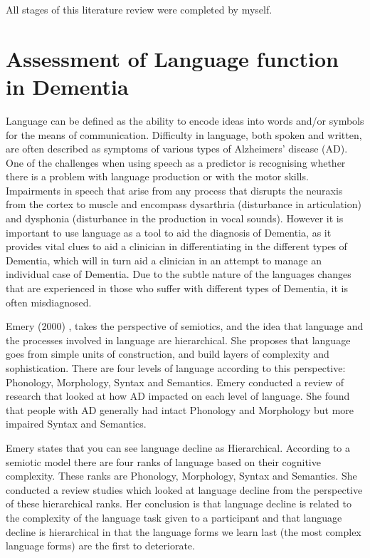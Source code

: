 \documentclass[a4paper]{article}
\begin{document}
All stages of this literature review were completed by myself. 

\section{Assessment of Language function in Dementia}

Language can be defined as the ability to encode ideas into words and/or symbols for the means of communication. Difficulty in language, both spoken and written, are often described as symptoms of various types of Alzheimers' disease (AD). One of the challenges when using speech as a predictor is recognising whether there is a problem with language production or with the motor skills. Impairments in speech that arise from any process that disrupts the neuraxis from the cortex to muscle and encompass dysarthria (disturbance in articulation) and dysphonia (disturbance in the production in vocal sounds). However it is important to use language as a tool to aid the diagnosis of Dementia, as it provides vital clues to aid a clinician in differentiating in the different types of Dementia, which will in turn aid a clinician in an attempt to manage an individual case of Dementia. Due to the subtle nature of the languages changes that are experienced in those who suffer with different types of Dementia, it is often misdiagnosed.

Emery (2000)  \cite{Emery2000}, takes the perspective of semiotics, and the idea that language and the processes involved in language are hierarchical. She proposes that language goes from simple units of construction, and build layers of complexity and sophistication. There are four levels of language according to this perspective: Phonology, Morphology, Syntax and Semantics. Emery conducted a review of research that looked at how AD impacted on each level of language. She found that people with AD generally had intact Phonology and Morphology but more impaired Syntax and Semantics. 	 

Emery states that you can see language decline as Hierarchical. According to a semiotic model there are four ranks of language based on their cognitive complexity. These ranks are Phonology, Morphology, Syntax and Semantics. She conducted a review studies which looked at language decline from the perspective of these hierarchical ranks. Her conclusion is that language decline is related to the complexity of the language task given to a participant and that language decline is hierarchical in that the language forms we learn last (the most complex language forms) are the first to deteriorate.
\end{document}
